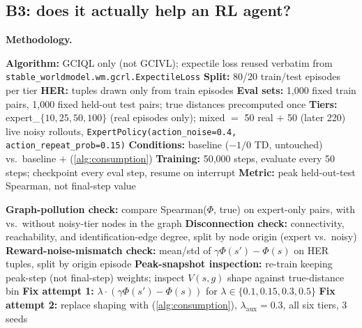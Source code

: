 \documentclass[11pt]{article}
\begin{document}
\subsection{B3: does it actually help an RL agent?}
\label{sec:b3-results}

\textbf{Methodology.}

\begin{algorithm}[H]
\caption{B3 methodology: setup and the initial shaping test}
\begin{algorithmic}[1]
\State \textbf{Algorithm:} GCIQL only (not GCIVL); expectile loss reused verbatim from \texttt{stable\_worldmodel.wm.gcrl.ExpectileLoss}
\State \textbf{Split:} 80/20 train/test episodes per tier 
\State \textbf{HER:} tuples drawn only from train episodes
\State \textbf{Eval sets:} 1{,}000 fixed train pairs, 1{,}000 fixed held-out test pairs; true distances precomputed once
\State \textbf{Tiers:} expert\_$\{10,25,50,100\}$ (real episodes only); mixed $=$ 50 real $+$ 50 (later 220) live noisy rollouts, \texttt{ExpertPolicy(action\_noise{=}0.4, action\_repeat\_prob{=}0.15)}
\State \textbf{Conditions:} baseline ($-1/0$ TD, untouched) vs.\ baseline $+$  (\cref{alg:consumption})
\State \textbf{Training:} 50{,}000 steps, evaluate every 50 steps; checkpoint every eval step, resume on interrupt
\State \textbf{Metric:} peak held-out-test Spearman, not final-step value 
\end{algorithmic}
\end{algorithm}

\begin{algorithm}[H]
\caption{B3 methodology: mechanism diagnosis and fix attempts, once shaping was found to fail}
\begin{algorithmic}[1]
\State \textbf{Graph-pollution check:} compare Spearman($\Phi$, true) on expert-only pairs, with vs.\ without noisy-tier nodes in the graph
\State \textbf{Disconnection check:} connectivity, reachability, and identification-edge degree, split by node origin (expert vs.\ noisy)
\State \textbf{Reward-noise-mismatch check:} mean/std of $\gamma\Phi(s')-\Phi(s)$ on HER tuples, split by origin episode
\State \textbf{Peak-snapshot inspection:} re-train keeping peak-step (not final-step) weights; inspect $V(s,g)$ shape against true-distance bin
\State \textbf{Fix attempt 1:} $\lambda\cdot(\gamma\Phi(s')-\Phi(s))$ for $\lambda \in \{0.1, 0.15, 0.3, 0.5\}$ 
\State \textbf{Fix attempt 2:} replace shaping with  (\cref{alg:consumption}), $\lambda_{\text{aux}}=0.3$, all six tiers, 3 seeds
\end{algorithmic}
\end{algorithm}
\end{document}
